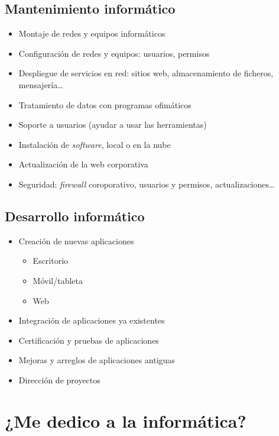 \documentclass{article}
\begin{document}
\subsection{Mantenimiento informático}
\label{sec:org0000006}
\begin{itemize}
\item Montaje de redes y equipos informáticos
\item Configuración de redes y equipos: usuarios, permisos
\item Despliegue de servicios en red: sitios web, almacenamiento de ficheros, mensajería\ldots{}
\item Tratamiento de datos con programas ofimáticos
\item Soporte a usuarios (ayudar a usar las herramientas)
\item Instalación de \emph{software}, local o en la nube
\item Actualización de la web corporativa
\item Seguridad: \emph{firewall} coroporativo, usuarios y permisos, actualizaciones\ldots{}
\end{itemize}

\subsection{Desarrollo informático}
\label{sec:org0000009}
\begin{itemize}
\item Creación de nuevas aplicaciones
\begin{itemize}
\item Escritorio
\item Móvil/tableta
\item Web
\end{itemize}
\item Integración de aplicaciones ya existentes
\item Certificación y pruebas de aplicaciones
\item Mejoras y arreglos de aplicaciones antiguas
\item Dirección de proyectos
\end{itemize}

\section{¿Me dedico a la informática?}
\label{sec:org0000018}
\end{document}
